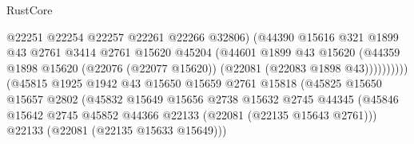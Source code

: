 \begin{lexlean}{RustCore}
\begin{coremodule}
                                            @22251
                                            @22254
                                            @22257
                                            @22261
                                            @22266
                                            @32806)
                                          (@44390
                                            @15616
                                            @321
                                            @1899
                                            @43
                                            @2761
                                            @3414
                                            @2761
                                            @15620
                                            @45204
                                            (@44601
                                              @1899
                                              @43
                                              @15620
                                              (@44359
                                                @1898
                                                @15620
                                                (@22076 (@22077 @15620))
                                                (@22081 (@22083 @1898 @43))))))))))
                                (@45815
                                  @1925
                                  @1942
                                  @43
                                  @15650
                                  @15659
                                  @2761
                                  @15818
                                  (@45825
                                    @15650
                                    @15657
                                    @2802
                                    (@45832
                                      @15649
                                      @15656
                                      @2738
                                      @15632
                                      @2745
                                      @44345
                                      (@45846
                                        @15642
                                        @2745
                                        @45852
                                        @44366
                                        @22133
                                        (@22081 (@22135 @15643 @2761)))
                                      @22133
                                      (@22081 (@22135 @15633 @15649)))

\end{coremodule}
\end{lexlean}
